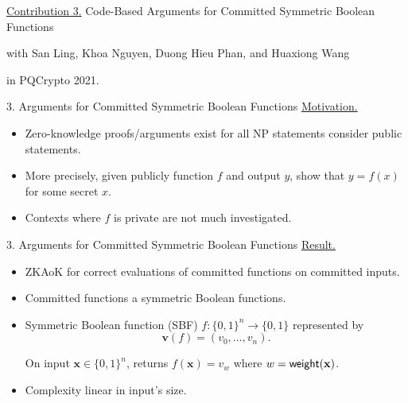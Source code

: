 \begin{frame}
	\underline{Contribution 3.} Code-Based Arguments for Committed Symmetric Boolean Functions
	
	{\small with San Ling, Khoa Nguyen, Duong Hieu Phan, and Huaxiong Wang}
	
	in PQCrypto 2021.
\end{frame}

\begin{frame}{3. Arguments for Committed Symmetric Boolean Functions}
	\underline{Motivation.} 
	\begin{itemize}
		\item Zero-knowledge proofs/arguments exist for all NP statements consider public statements.
		\item More precisely, given publicly function $f$ and output $y$, show that $y = f(x)$ for some secret $x$.
		\item Contexts where $f$ is private are not much investigated.
	\end{itemize}
\end{frame} 
\begin{frame}{3. Arguments for Committed Symmetric Boolean Functions}
	\underline{Result.}
	\begin{itemize}
		\item ZKAoK for correct evaluations of committed functions on committed inputs.
		\item Committed functions a symmetric Boolean functions.
		\item Symmetric Boolean function (SBF) $f : \{0,1\}^n \to \{0,1\}$ represented by 
		\begin{equation*}
			\mathbf{v}(f) = (v_0, \dots, v_n).
		\end{equation*}
		
		On input $\mathbf{x} \in \{0,1\}^n$, returns $f(\mathbf{x}) = v_w$ where $w = \mathsf{weight}(\mathbf{x})$.
		\item Complexity linear in input's size.
	\end{itemize}
\end{frame}

